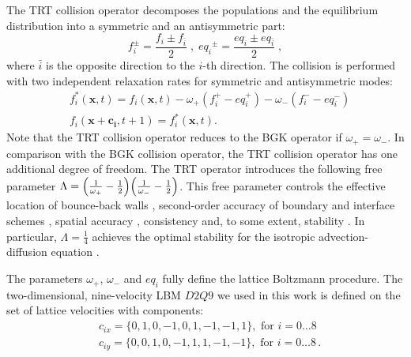 \documentclass[preprint,12pt]{elsarticle}
\newcommand{\beqal}{\begin{equation}\begin{aligned}}
\newcommand{\feqal}{\end{aligned}\end{equation}}
\newcommand{\omegaplus}{\omega_{+}}
\newcommand{\omegaminus}{\omega_{-}}
\begin{document}
The TRT collision operator \cite{ginzburg-boundary-main}
decomposes the populations and the equilibrium
distribution into a symmetric and an antisymmetric part:
\begin{equation}
\label{trtdecomp}
f^{\pm}_i=\frac{f_i\pm f_{\bar{i}}}{2}\;,\; 
{eq_i}^{\pm}=\frac{eq_i\pm eq_{\bar{i}}}{2}\;,
\end{equation}
where $\bar{i}$ is the opposite direction to the $i$-th direction.
The collision is performed with two independent relaxation rates for 
symmetric and antisymmetric modes:
\begin{equation}
\label{trt}
\begin{aligned}
&f_i^{*}(\bm{x},t)=f_i(\bm{x},t)-\omegaplus (f_i^{+} - eq_i^+)-\omegaminus
(f_i^{-} -
eq_i^-)\\
&f_i(\bm{x}+\bm{c_i},t+1)=f_i^{*}(\bm{x},t).
\end{aligned}
\end{equation}
Note that the TRT collision operator reduces to the BGK operator if
$\omegaplus=\omegaminus$. In comparison with the BGK collision operator,
the TRT collision operator has one additional degree of freedom. The TRT operator 
introduces
the following free parameter
$\Lambda=\Bigl(\frac{1}{\omegaplus}-\frac{1}{2}\Bigr)\Bigl(\frac{1}{\omegaminus}-\frac{1}{2}
\Bigr)$. 
This free parameter controls the effective location of  bounce-back
walls \cite{ginzburg-multireflection}, second-order accuracy of
boundary \cite{ginzburg-boundary-main} and interface schemes \cite{ginzburg-discontinious}, 
spatial accuracy \cite{ginzburg-recurrence,servan-trt-stability},
consistency \cite{ginzburg-brinkman} and, to some extent,
stability \cite{kuzmin-stability-optimal,kuzmin-d1q3,servan-trt-stability}.
In particular, $\Lambda=\frac{1}{4}$ achieves the optimal stability for the
isotropic advection-diffusion equation \cite{kuzmin-stability-optimal}. 

The parameters $\omegaplus$, $\omegaminus$ and $eq_i$ fully define the lattice Boltzmann
procedure. The two-dimensional, nine-velocity LBM $D2Q9$ we used in this work is defined on the set
of lattice
velocities with components:
\beqal
&c_{ix}=\{0,1,0,-1,0,1,-1,-1,1\},\text{ for } i=0\dots8\\
&c_{iy}=\{0,0,1,0,-1,1,1,-1,-1\},\text{ for } i=0\dots8\,.
\feqal
\end{document}
